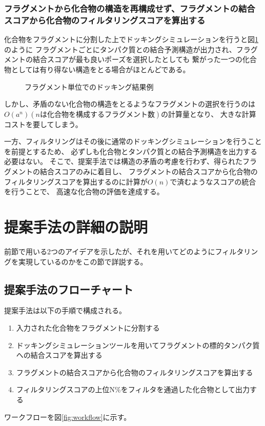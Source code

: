\subsubsection{フラグメントから化合物の構造を再構成せず、フラグメントの結合スコアから化合物のフィルタリングスコアを算出する}
化合物をフラグメントに分割した上でドッキングシミュレーションを行うと図\ref{fig:divided_fragment}のように
フラグメントごとにタンパク質との結合予測構造が出力され、フラグメントの結合スコアが最も良いポーズを選択したとしても
繋がった一つの化合物としては有り得ない構造をとる場合がほとんどである。
\begin{figure}[t]
 \begin{center}
  \caption{フラグメント単位でのドッキング結果例}
  \label{fig:divided_fragment}
 \end{center}
\end{figure}
しかし、矛盾のない化合物の構造をとるようなフラグメントの選択を行うのは$O(a^n) (nは化合物を構成するフラグメント数)$の計算量となり、
大きな計算コストを要してしまう。

一方、フィルタリングはその後に通常のドッキングシミュレーションを行うことを前提とするため、
必ずしも化合物とタンパク質との結合予測構造を出力する必要はない。
そこで、提案手法では構造の矛盾の考慮を行わず、得られたフラグメントの結合スコアのみに着目し、
フラグメントの結合スコアから化合物のフィルタリングスコアを算出するのに計算が$O(n)$で済むようなスコアの統合を行うことで、
高速な化合物の評価を達成する。

\section{提案手法の詳細の説明}
前節で用いる2つのアイデアを示したが、それを用いてどのようにフィルタリングを実現しているのかをこの節で詳説する。

\subsection{提案手法のフローチャート}\label{subsec:flowchart}
提案手法は以下の手順で構成される。
\begin{enumerate}
\item 入力された化合物をフラグメントに分割する
\item ドッキングシミュレーションツールを用いてフラグメントの標的タンパク質への結合スコアを算出する
\item フラグメントの結合スコアから化合物のフィルタリングスコアを算出する
\item フィルタリングスコアの上位N\%をフィルタを通過した化合物として出力する
\end{enumerate}
ワークフローを図\ref{fig:workflow}に示す。

